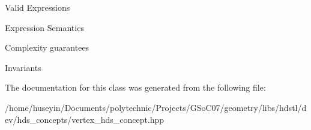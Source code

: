 \begin{Desc}
\item[Valid Expressions]\end{Desc}
\begin{Desc}
\item[Expression Semantics]\end{Desc}
\begin{Desc}
\item[Complexity guarantees]\end{Desc}
\begin{Desc}
\item[Invariants ]\end{Desc}




The documentation for this class was generated from the following file:\begin{CompactItemize}
\item 
/home/huseyin/Documents/polytechnic/Projects/GSo\-C07/geometry/libs/hdstl/dev/hds\_\-concepts/vertex\_\-hds\_\-concept.hpp\end{CompactItemize}
